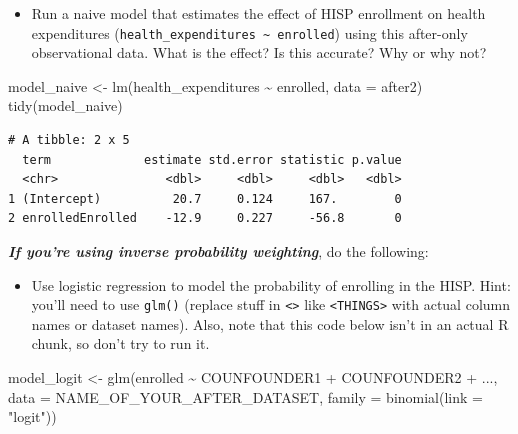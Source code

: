 \documentclass[
  letterpaper,
  DIV=11,
  numbers=noendperiod]{scrartcl}
\newenvironment{Shaded}{\begin{snugshade}}{\end{snugshade}}
\newcommand{\AttributeTok}[1]{\textcolor[rgb]{0.40,0.45,0.13}{#1}}
\newcommand{\FunctionTok}[1]{\textcolor[rgb]{0.28,0.35,0.67}{#1}}
\newcommand{\NormalTok}[1]{\textcolor[rgb]{0.00,0.23,0.31}{#1}}
\newcommand{\OtherTok}[1]{\textcolor[rgb]{0.00,0.23,0.31}{#1}}
\newcommand{\SpecialCharTok}[1]{\textcolor[rgb]{0.37,0.37,0.37}{#1}}
\newcommand{\StringTok}[1]{\textcolor[rgb]{0.13,0.47,0.30}{#1}}
\providecommand{\tightlist}{%
  \setlength{\itemsep}{0pt}\setlength{\parskip}{0pt}}\usepackage{longtable,booktabs,array}
\begin{document}
\begin{itemize}
\tightlist
\item
  Run a naive model that estimates the effect of HISP enrollment on
  health expenditures
  (\texttt{health\_expenditures\ \textasciitilde{}\ enrolled}) using
  this after-only observational data. What is the effect? Is this
  accurate? Why or why not?
\end{itemize}

\begin{Shaded}
\begin{Highlighting}[numbers=left,,]
\NormalTok{model\_naive }\OtherTok{\textless{}{-}} \FunctionTok{lm}\NormalTok{(health\_expenditures }\SpecialCharTok{\textasciitilde{}}\NormalTok{ enrolled, }\AttributeTok{data =}\NormalTok{ after2)}
\FunctionTok{tidy}\NormalTok{(model\_naive)}
\end{Highlighting}
\end{Shaded}

\begin{verbatim}
# A tibble: 2 x 5
  term             estimate std.error statistic p.value
  <chr>               <dbl>     <dbl>     <dbl>   <dbl>
1 (Intercept)          20.7     0.124     167.        0
2 enrolledEnrolled    -12.9     0.227     -56.8       0
\end{verbatim}

\textbf{\emph{If you're using inverse probability weighting}}, do the
following:

\begin{itemize}
\tightlist
\item
  Use logistic regression to model the probability of enrolling in the
  HISP. Hint: you'll need to use \texttt{glm()} (replace stuff in
  \texttt{\textless{}\textgreater{}} like
  \texttt{\textless{}THINGS\textgreater{}} with actual column names or
  dataset names). Also, note that this code below isn't in an actual R
  chunk, so don't try to run it.
\end{itemize}

\begin{Shaded}
\begin{Highlighting}[numbers=left,,]
\NormalTok{model\_logit }\OtherTok{\textless{}{-}} \FunctionTok{glm}\NormalTok{(enrolled }\SpecialCharTok{\textasciitilde{}}\NormalTok{ COUNFOUNDER1 }\SpecialCharTok{+}\NormalTok{ COUNFOUNDER2 }\SpecialCharTok{+}\NormalTok{ ...,}
                   \AttributeTok{data =}\NormalTok{ NAME\_OF\_YOUR\_AFTER\_DATASET,}
                   \AttributeTok{family =} \FunctionTok{binomial}\NormalTok{(}\AttributeTok{link =} \StringTok{"logit"}\NormalTok{))}
\end{Highlighting}
\end{Shaded}
\end{document}
